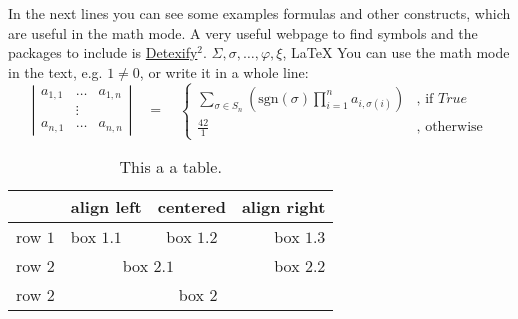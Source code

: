 In the next lines you can see some examples formulas and other
constructs, which are useful in the math mode. A very useful webpage
to find symbols and the packages to include is 
\href{http://detexify.kirelabs.org/classify.html}{Detexify$^2$}.
$\Sigma, \sigma, \ldots, \varphi, \xi$, \LaTeX
You can use the math mode in the text, e.g. $1\neq0$, or write it in
a whole line:
$$\left|
	\begin{array}{ccc}
		a_{1,1} & \ldots & a_{1,n}  \\
				& \vdots & 			\\
		a_{n,1} & \ldots & a_{n,n}
	\end{array}
\right|
\quad = \quad 
\left\{
	\begin{array}{ll}
			{\displaystyle \sum\limits_{\sigma\in S_n}} 
			\left(
				\text{sgn}(\sigma)
				\prod\limits_{i=1}^{n}a_{i,\sigma(i)}
			\right) 
			& 
			\text{, if }True 
		\\[0.6cm] %
			{\displaystyle\frac{42}{1}} & \text{, otherwise}
	\end{array}
\right.$$


\begin{table}[htb]
	\caption{This a a table.}
	\label{tab:nameOfTheTable}
	\bigskip %
	\begin{center}
		\begin{tabular}{|l||l|c|r|}
			\hline
			& align left 	& centered & align right \\
			\hline \hline
			row $1$ & box $1.1$ & box $1.2$ & box $1.3$ \\
			\hline
			row $2$ & \multicolumn{2}{c|}{box $2.1$} & box $2.2$ \\
			\hline
			row $2$ & \multicolumn{3}{c|}{box $2$} \\
			\hline
		\end{tabular}
	\end{center}
\end{table}
